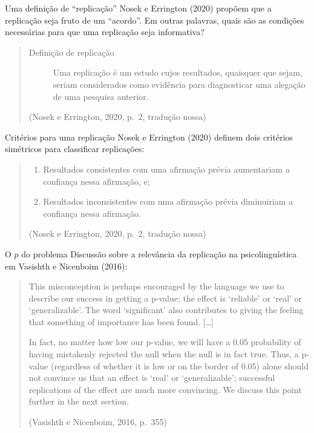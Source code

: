 \documentclass[numbering=fraction,aspectratio=169]{beamer}
\begin{document}
\begin{frame}{Uma definição de “replicação”}
  Nosek e Errington (2020) propõem que \alert<1>{a replicação seja fruto de um “acordo”}. \pause Em outras palavras, \alert{quais são as condições necessárias para que uma replicação seja informativa?} \pause
  \bigskip

  \begin{quote}
    \begin{description}
    \item[Definição de replicação] Uma replicação é um estudo cujos resultados, quaisquer que sejam, seriam considerados como evidência para diagnosticar uma alegação de uma pesquisa anterior.
    \end{description}

    \medskip
    \raggedleft
    (Nosek e Errington, 2020, p.~2, tradução nossa)
  \end{quote}
\end{frame}

\begin{frame}{Critérios para uma replicação}
  Nosek e Errington (2020) definem \alert{dois critérios simétricos} para classificar replicações:
  \medskip

  \begin{quote}
    \begin{enumerate}
    \item Resultados \alert{consistentes} com uma afirmação prévia \alert{aumentariam} a confiança nessa afirmação, e; \pause
    \item Resultados \alert{inconsistentes} com uma afirmação prévia \alert{diminuiriam} a confiança nessa afirmação.
    \end{enumerate}

    \medskip
    \raggedleft
    (Nosek e Errington, 2020, p.~2, tradução nossa)
  \end{quote}
\end{frame}

\begin{frame}{O $p$ do problema}
  Discussão sobre a \alert{relevância da replicação na psicolinguística} em Vasishth e Nicenboim (2016):
  \medskip

  \small
  \begin{quotation}
    \alert<1>{This misconception is perhaps encouraged by the language we use to describe our success in getting a p-value; the effect is ‘reliable’ or ‘real’ or ‘generalizable’.} \alert<2>{The word ‘significant’ also contributes to giving the feeling that something of importance has been found.} […]

    In fact, \alert<3>{no matter how low our p-value, we will have a 0.05 probability of having mistakenly rejected the null when the null is in fact true.} \alert<4>{Thus, a p-value (regardless of whether it is low or on the border of 0.05) alone should not convince us that an effect is ‘real’ or ‘generalizable’; successful replications of the effect are much more convincing.} We discuss this point further in the next section.

    \raggedleft
    (Vasishth e Nicenboim, 2016, p.~355)
  \end{quotation}
\end{frame}
\end{document}
